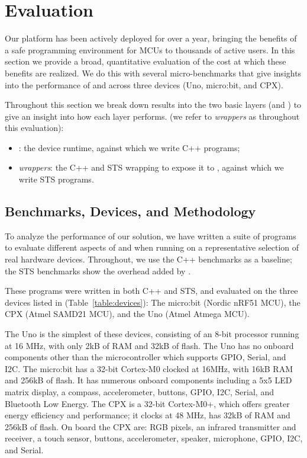 \section{Evaluation}
\label{sec:evaluate}

Our platform has been actively deployed for over a year, bringing the benefits of
a safe programming environment for MCUs to thousands of active users.
In this section we provide a broad, quantitative evaluation of the cost at which
these benefits are realized. We do this with several micro-benchmarks that
give insights into the performance of \MC and \CO across three devices
(Uno, micro:bit, and CPX).

Throughout this
section we break down results into the two basic layers (\CO and \MCN)
to give an insight into how each layer performs.
(we refer to \emph{\MC wrappers} as \MC throughout this evaluation):
\begin{itemize}
\item \emph{\CO}: the device runtime, against which we write C++ programs;
\item \emph{\MC wrappers}: the C++ and STS wrapping \CO
to expose it to \MC, against which we write STS programs.
\end{itemize}

\subsection{Benchmarks, Devices, and Methodology}

To analyze the performance of our solution, we have written a suite of programs to evaluate
different aspects of \MC and \CO when running on a representative selection of real hardware devices.
Throughout, we use the C++ \CO benchmarks as a baseline;
the STS benchmarks show the overhead added by \MC.

These programs were written in both C++ and STS, and evaluated on the three
devices listed in (Table~\ref{table:devices}): The micro:bit (Nordic nRF51 MCU),
the CPX (Atmel SAMD21 MCU), and the Uno (Atmel Atmega MCU).

The Uno is the simplest of these devices,
consisting of an 8-bit processor running at 16 MHz,
with only 2kB of RAM and 32kB of flash.
The Uno has no onboard components other than the microcontroller which supports
GPIO, Serial, and I2C.
The micro:bit has a 32-bit Cortex-M0 clocked at 16MHz, with 16kB RAM and 256kB of flash. It has numerous onboard components
including a 5x5 LED matrix display, a compass, accelerometer, buttons, GPIO, I2C, Serial, and Bluetooth Low Energy.
The CPX is a 32-bit Cortex-M0+, which offers greater energy efficiency and performance; it clocks at 48 MHz, has 32kB of RAM and
256kB of flash. On board the CPX are: RGB pixels, an infrared transmitter and receiver, a touch sensor, buttons, accelerometer, speaker,
microphone, GPIO, I2C, and Serial.

